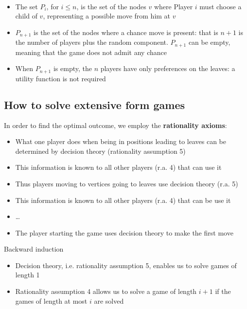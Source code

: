 \documentclass[../main.tex]{subfiles}
\begin{document}
\begin{note}\
    \begin{itemize}
        \item The set $P_i$, for $i \leq n$, is the set of the nodes $v$ where Player $i$ must choose a child of $v$, representing a possible move from him at $v$
        \item $P_{n+1}$ is the set of the nodes where a chance move is present: that is $n+1$ is the number of players plus the random component. $P_{n+1}$ can be empty, meaning that the game does not admit any chance
        \item When $P_{n+1}$ is empty, the $n$ players have only preferences on the leaves: a utility function is not required
    \end{itemize}
\end{note}

\subsection{How to solve extensive form games}
In order to find the optimal outcome, we employ the \textbf{rationality axioms}:
\begin{itemize}
    \item What one player does when being in positions leading to leaves can be determined by decision theory (rationality assumption 5)
    \item This information is known to all other players (r.a. 4) that can use it
    \item Thus players moving to vertices going to leaves use decision theory (r.a. 5)
    \item This information is known to all other players (r.a. 4) that can be use it
    \item \ldots
    \item The player starting the game uses decision theory to make the first move
\end{itemize}

\begin{algorithm*}
    \caption*{Backward induction}
    \begin{itemize}
        \item Decision theory, i.e. rationality assumption 5, enables us to solve games of length 1
        \item Rationality assumption 4 allows us to solve a game of length $i + 1$ if the games of length at most $i$ are solved
    \end{itemize}
\end{algorithm*}
\end{document}
